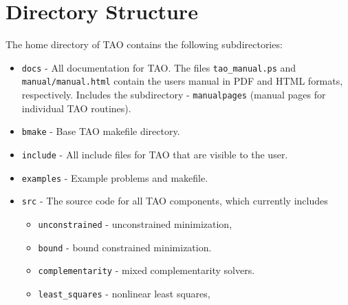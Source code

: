 \section{Directory Structure}

The home directory of TAO contains the following subdirectories:

\begin{itemize}
\item \texttt{docs} - All documentation for TAO. The files \texttt{tao\_manual.ps}
                   and \texttt{manual/manual.html} contain the users manual in
                   PDF and HTML formats, respectively. Includes
                   the subdirectory
 \subitem - \texttt{manualpages} (manual pages for individual TAO routines).
\item \texttt{bmake} - Base TAO makefile directory.  
\item \texttt{include} - All include files for TAO that are visible to the user.
\item \texttt{examples} - Example problems and makefile.
\item \texttt{src} - The source code for all TAO components, which
                  currently includes
 \begin{itemize}
 \item \texttt{unconstrained} - unconstrained minimization,
 \item \texttt{bound} - bound constrained minimization.
 \item \texttt{complementarity} - mixed complementarity solvers.
 \item \texttt{least\_squares} - nonlinear least squares,
 \end{itemize}
\end{itemize}

